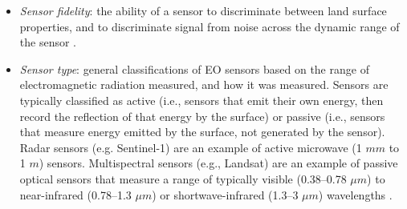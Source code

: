 \begin{itemize}
\item \textit{Sensor fidelity}: the ability of a sensor to discriminate between land surface properties, and to discriminate signal from noise across the dynamic range of the sensor \cite{Campbell2011-sa}.

\item \textit{Sensor type}: general classifications of EO sensors based on the range of electromagnetic radiation measured, and how it was measured. Sensors are typically classified as active (i.e., sensors that emit their own energy, then record the reflection of that energy by the surface) or passive (i.e., sensors that measure energy emitted by the surface, not generated by the sensor). Radar sensors (e.g. Sentinel-1) are an example of active microwave (1 $mm$ to 1 $m$) sensors. Multispectral sensors (e.g., Landsat) are an example of passive optical sensors that measure a range of typically visible (0.38–0.78 ${\mu}m$) to near-infrared (0.78–1.3 ${\mu}m$) or shortwave-infrared (1.3–3 ${\mu}m$) wavelengths \cite{Campbell2011-sa}.

\end{itemize}